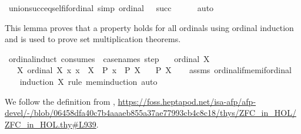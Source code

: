 \begin{isabellebody}
\isanewline
{}\isamarkupfalse%
\ union{\isacharunderscore}{\kern0pt}succ{\isacharunderscore}{\kern0pt}eq{\isacharunderscore}{\kern0pt}self{\isacharunderscore}{\kern0pt}if{\isacharunderscore}{\kern0pt}ordinal\ {\isacharbrackleft}{\kern0pt}simp{\isacharbrackright}{\kern0pt}{\isacharcolon}{\kern0pt}\ {\isachardoublequoteopen}ordinal\ {\isasymbeta}\ {\isasymLongrightarrow}\ {\isasymUnion}{\isacharparenleft}{\kern0pt}succ\ {\isasymbeta}{\isacharparenright}{\kern0pt}\ {\isacharequal}{\kern0pt}\ {\isasymbeta}{\isachardoublequoteclose}%
\isadelimproof
\ %
\endisadelimproof
%
\isatagproof
{}\isamarkupfalse%
\ auto%
\endisatagproof
{\isafoldproof}%
%
\isadelimproof
%
\endisadelimproof
%
\begin{isamarkuptext}%
This lemma proves that a property  holds for all ordinals using ordinal induction 
and is used to prove set multiplication theorems.%
\end{isamarkuptext}\isamarkuptrue%
\isamarkupfalse%
\ ordinal{\isacharunderscore}{\kern0pt}induct\ {\isacharbrackleft}{\kern0pt}consumes\ {}{\isacharcomma}{\kern0pt}\ case{\isacharunderscore}{\kern0pt}names\ step{\isacharbrackright}{\kern0pt}{\isacharcolon}{\kern0pt}\isanewline
\ \ \ {\isachardoublequoteopen}ordinal\ X{\isachardoublequoteclose}\isanewline
\ \ \ {\isachardoublequoteopen}{\isasymAnd}X{\isachardot}{\kern0pt}\ {\isasymlbrakk}ordinal\ X{\isacharsemicolon}{\kern0pt}\ {\isasymAnd}x{\isachardot}{\kern0pt}\ x\ {\isasymin}\ X\ {\isasymLongrightarrow}\ P\ x{\isasymrbrakk}\ {\isasymLongrightarrow}\ P\ X{\isachardoublequoteclose}\isanewline
\ \ \ {\isachardoublequoteopen}P\ X{\isachardoublequoteclose}\isanewline
%
\isadelimproof
\ \ %
\endisadelimproof
%
\isatagproof
{}\isamarkupfalse%
\ assms\ ordinal{\isacharunderscore}{\kern0pt}if{\isacharunderscore}{\kern0pt}mem{\isacharunderscore}{\kern0pt}if{\isacharunderscore}{\kern0pt}ordinal\isanewline
\ \ \isamarkupfalse%
\ {\isacharparenleft}{\kern0pt}induction\ X\ rule{\isacharcolon}{\kern0pt}\ mem{\isacharunderscore}{\kern0pt}induction{\isacharparenright}{\kern0pt}\ auto%
\endisatagproof
{\isafoldproof}%
%
\isadelimproof
%
\endisadelimproof
%
\isadelimdocument
%
\endisadelimdocument
%
\isatagdocument
%
\isamarkuptrue%
%
\endisatagdocument
{\isafolddocument}%
%
\isadelimdocument
%
\endisadelimdocument
%
\begin{isamarkuptext}%
We follow the definition from \cite{ZFC_in_HOL_AFP}, \url{https://foss.heptapod.net/isa-afp/afp-devel/-/blob/06458dfa40c7b4aaaeb855a37ae77993cb4c8c18/thys/ZFC_in_HOL/ZFC_in_HOL.thy\#L939}.

\end{isamarkuptext}
\end{isabellebody}
